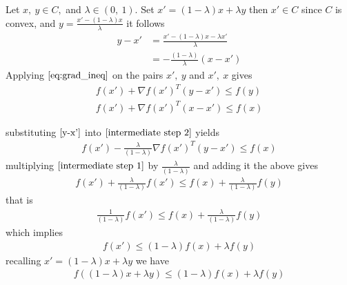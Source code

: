 \documentclass{ExerciseSheet}
\begin{document}
\begin{solution}
\begin{itemize}
Let $x,~y\in C,$ and $\lambda\in (0,~1).$ Set $x'=(1-\lambda)x+\lambda y$ then $x'\in C$ since $C$ is convex, and $y=\frac{x'-(1-\lambda)x}{\lambda}$ it follows
   \begin{align}
       y-x' &= \frac{x'-(1-\lambda)x-\lambda x'}{\lambda}\nonumber\\
            &=-\frac{(1-\lambda)}{\lambda}(x-x')   \label{y-x'}
   \end{align}
 Applying $\eqref{eq:grad_ineq}$ on the pairs $x',~y$ and $x',~x$ gives           
    \begin{align}
        f(x') +\nabla f(x')^T(y-x')\leq f(y) \label{intermediate step 1}\\
        f(x') +\nabla f(x')^T(x-x')\leq f(x)  \label{intermediate step 2}
    \end{align}

    substituting $\eqref{y-x'}$ into $\eqref{intermediate step 2}$ yields
     \begin{align*}
         f(x') -\frac{\lambda}{(1-\lambda)}\nabla f(x')^T(y-x')\leq f(x)
     \end{align*}
    multiplying $\eqref{intermediate step 1}$ by $\frac{\lambda}{(1-\lambda)}$ and adding it the above gives
        \begin{align*}
           f(x')+ \frac{\lambda}{(1-\lambda)}f(x') \leq f(x) + \frac{\lambda}{(1-\lambda)}f(y)
        \end{align*}
    that is
     \begin{align*}
            \frac{1}{(1-\lambda)}f(x') \leq f(x) + \frac{\lambda}{(1-\lambda)}f(y)
        \end{align*}
    which implies
        \begin{align*}
            f(x') \leq (1-\lambda)f(x) + \lambda f(y)
        \end{align*}
    recalling $x'=(1-\lambda)x+\lambda y$ we have
     \begin{align*}
            f((1-\lambda)x+\lambda y) \leq (1-\lambda)f(x) + \lambda f(y)
        \end{align*}
\end{itemize}

\end{solution}

\fi
\end{document}
